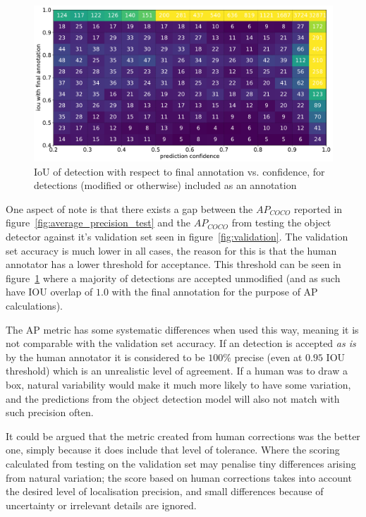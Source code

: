 \begin{figure}[ht]
\centering
\includegraphics[width=1.0\linewidth]{charts/scatters/confidence_iou.pdf}
\caption{ IoU of detection with respect to final annotation vs. confidence, for detections (modified or otherwise) included as an annotation }
\label{fig:iou_confidence}
\end{figure}

One aspect of note is that there exists a gap between the $AP_{COCO}$ reported in figure~\ref{fig:average_precision_test} and the $AP_{COCO}$ from testing the object detector against it's validation set seen in figure~\ref{fig:validation}. The validation set accuracy is much lower in all cases, the reason for this is that the human annotator has a lower threshold for acceptance. This threshold can be seen in figure~\ref{fig:iou_confidence} where a majority of detections are accepted unmodified (and as such have \gls{IOU} overlap of $1.0$ with the final annotation for the purpose of \gls{AP} calculations).

The \gls{AP} metric has some systematic differences when used this way, meaning it is not comparable with the validation set accuracy. If an detection is accepted \emph{as is} by the human annotator it is considered to be $100\%$ precise (even at $0.95$ \gls{IOU} threshold) which is an unrealistic level of agreement. If a human was to draw a box, natural variability would make it much more likely to have some variation, and the predictions from the object detection model will also not match with such precision often.

It could be argued that the metric created from human corrections was the better one, simply because it does include that level of tolerance. Where the scoring calculated from testing on the validation set may penalise tiny differences arising from natural variation; the score based on human corrections takes into account the desired level of localisation precision, and small differences because of uncertainty or irrelevant details are ignored.

